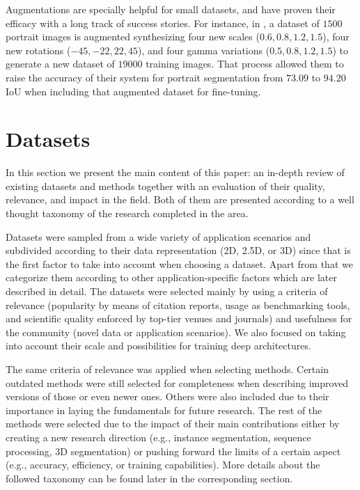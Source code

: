 Augmentations are specially helpful for small datasets, and have proven their efficacy with a long track of success stories. For instance, in \cite{Shen2016}, a dataset of $1500$ portrait images is augmented synthesizing four new scales ($0.6, 0.8, 1.2, 1.5$), four new rotations ($-45, -22, 22, 45$), and four gamma variations ($0.5, 0.8, 1.2, 1.5$) to generate a new dataset of $19000$ training images. That process allowed them to raise the accuracy of their system for portrait segmentation from $73.09$ to $94.20$ \ac{IoU} when including that augmented dataset for fine-tuning.

\section{Datasets}

In this section we present the main content of this paper: an in-depth review of existing datasets and methods together with an evaluation of their quality, relevance, and impact in the field. Both of them are presented according to a well thought taxonomy of the research completed in the area.

Datasets were sampled from a wide variety of application scenarios and subdivided according to their data representation (2D, 2.5D, or 3D) since that is the first factor to take into account when choosing a dataset. Apart from that we categorize them according to other application-specific factors which are later described in detail. The datasets were selected mainly by using a criteria of relevance (popularity by means of citation reports, usage as benchmarking tools, and scientific quality enforced by top-tier venues and journals) and usefulness for the community (novel data or application scenarios). We also focused on taking into account their scale and possibilities for training deep architectures.

The same criteria of relevance was applied when selecting methods. Certain outdated methods were still selected for completeness when describing improved versions of those or even newer ones. Others were also included due to their importance in laying the fundamentals for future research. The rest of the methods were selected due to the impact of their main contributions either by creating a new research direction (e.g., instance segmentation, sequence processing, 3D segmentation) or  pushing forward the limits of a certain aspect (e.g., accuracy, efficiency, or training capabilities). More details about the followed taxonomy can be found later in the corresponding section.

